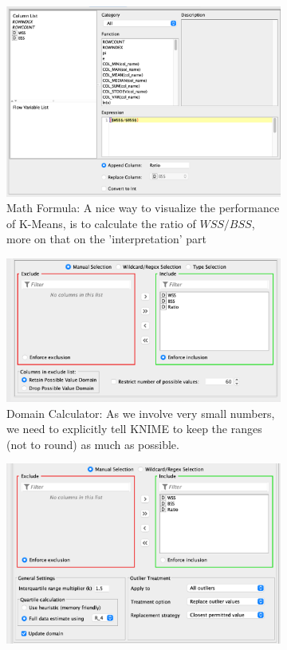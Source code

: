 \documentclass[11pt]{article}
\begin{document}
\begin{figure}[H]
\begin{subfigure}{0.4\textwidth}
					\includegraphics[width=\textwidth]{res/t1/t15/t15-math-formula-conf}
					\caption{Math Formula: A nice way to visualize the performance of K-Means, is to calculate the ratio of $WSS/BSS$, more on that on the 'interpretation' part}
					\label{fig:second}
				\end{subfigure}
				\hfill
				\begin{subfigure}{0.4\textwidth}
					\includegraphics[width=\textwidth]{res/t1/t15/t15-domain-calculator-conf}
					\caption{Domain Calculator: As we involve very small numbers, we need to explicitly tell KNIME to keep the ranges (not to round) as much as possible.}
					\label{fig:third}
				\end{subfigure}	
				\begin{subfigure}{0.4\textwidth}
					\includegraphics[width=\textwidth]{res/t1/t15/t15-numeric-outliers-conf}

\end{subfigure}
\end{figure}
\end{document}
